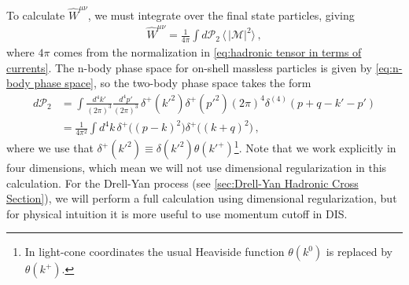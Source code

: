 To calculate $\hat{W}^{\mu\nu}$, we must integrate over the final state particles, giving
\begin{align}
    \hat{W}^{\mu\nu}=\frac{1}{4\pi}\int d\mathcal{P}_{2}\,\langle\, |\mathcal{M}|^{2}\rangle \,,
\end{align}
where $4\pi$ comes from the normalization in \cref{eq:hadronic tensor in terms of currents}. The n-body phase space for on-shell massless particles is given by \cref{eq:n-body phase space}, so the two-body phase space takes the form
\begin{align}\label{eq:DIS differential phase space}
    d\mathcal{P}_{2}&=\int\frac{d^{4}k'}{(2\pi)^{3}}\frac{d^{4}p'}{(2\pi)^{3}}\,\delta^{+}(k'^{2})\delta^{+}(p'^{2})(2\pi)^{4}\delta^{(4)}(p+q-k'-p')\nonumber
    \\
    &=\frac{1}{4\pi^{2}}\int d^{4}k\,\delta^{+}\big((p-k)^{2}\big)\delta^{+}\big((k+q)^{2}\big)\,,
\end{align}
where we use that $\delta^{+}(k'^{2})\equiv \delta(k'^{2})\theta(k'^{+})$\footnote{In light-cone coordinates the usual Heaviside function $\theta(k^{0})$ is replaced by $\theta(k^{+})$.}.
Note that we work explicitly in four dimensions, which mean we will not use dimensional regularization in this calculation. For the Drell-Yan process (see \cref{sec:Drell-Yan Hadronic Cross Section}), we will perform a full calculation using dimensional regularization, but for physical intuition it is more useful to use momentum cutoff in DIS.  

